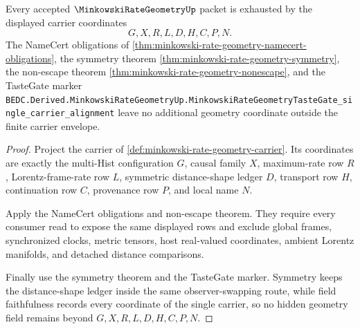 \begin{theorem}
\label{thm:minkowski-rate-geometry-carrier-envelope}
Every accepted $\MinkowskiRateGeometryUp$ packet is exhausted by the displayed carrier coordinates
$$
G,X,R,L,D,H,C,P,N.
$$
The NameCert obligations of \autoref{thm:minkowski-rate-geometry-namecert-obligations}, the symmetry theorem \autoref{thm:minkowski-rate-geometry-symmetry}, the non-escape theorem \autoref{thm:minkowski-rate-geometry-nonescape}, and the TasteGate marker \texttt{BEDC.Derived.MinkowskiRateGeometryUp.MinkowskiRateGeometryTasteGate\_single\_carrier\_alignment} leave no additional geometry coordinate outside the finite carrier envelope.
\end{theorem}
\begin{proof}
Project the carrier of \autoref{def:minkowski-rate-geometry-carrier}. Its coordinates are exactly the multi-Hist configuration $G$, causal family $X$, maximum-rate row $R$, Lorentz-frame-rate row $L$, symmetric distance-shape ledger $D$, transport row $H$, continuation row $C$, provenance row $P$, and local name $N$.

Apply the NameCert obligations and non-escape theorem. They require every consumer read to expose the same displayed rows and exclude global frames, synchronized clocks, metric tensors, host real-valued coordinates, ambient Lorentz manifolds, and detached distance comparisons.

Finally use the symmetry theorem and the TasteGate marker. Symmetry keeps the distance-shape ledger inside the same observer-swapping route, while field faithfulness records every coordinate of the single carrier, so no hidden geometry field remains beyond $G,X,R,L,D,H,C,P,N$.
\end{proof}

